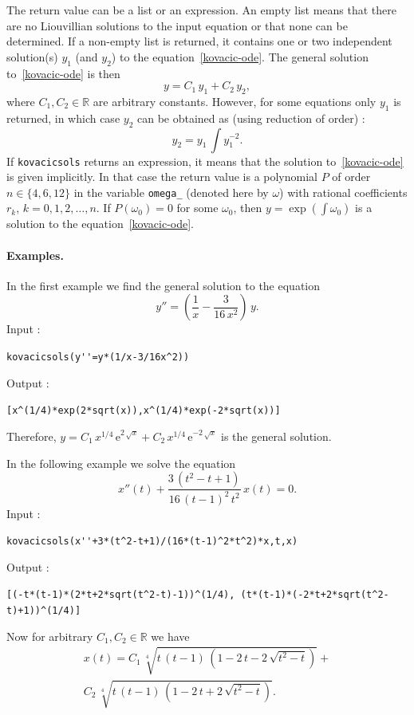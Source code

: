 \documentclass[a4paper,11pt]{book}
\newcommand{\C}{{\mathbb{C}}}
\begin{document}
The return value can be a list or an expression. An empty list means that there are no Liouvillian solutions to the input equation or that none can be determined. If a non-empty list is returned, it contains one or two independent solution(s) $y_1$ (and $y_2$) to the equation~\eqref{kovacic-ode}. The general solution to~\eqref{kovacic-ode} is then
\[ y=C_1\,y_1+C_2\,y_2, \]
where $C_1,C_2\in\mathbb{R}$ are arbitrary constants. However, for some equations only $y_1$ is returned, in which case $y_2$ can be obtained as (using reduction of order) :
\begin{equation}\label{kovacic-reduction}y_2=y_1\,\int y_1^{-2}.\end{equation}
If {\tt kovacicsols} returns an expression, it means that the solution to~\eqref{kovacic-ode} is given implicitly. In that case the return value is a polynomial $P$ of order $n\in\{4,6,12\}$ in the variable {\tt omega\_} (denoted here by $\omega$) with rational coefficients $r_k$, $k=0,1,2,\dots,n$. If $P(\omega_0)=0$ for some $\omega_0$, then $y=\exp\left(\int\omega_0\right)$ is a solution to the equation~\eqref{kovacic-ode}.

\paragraph{Examples.}
In the first example we find the general solution to the equation
\[ y''=\left(\frac{1}{x}-\frac{3}{16\,x^2}\right)\,y. \]
Input :
\begin{center}
  \tt kovacicsols(y\verb|''|=y*(1/x-3/16x\verb|^|2))
\end{center}
Output :
\begin{center}
  \tt [x\verb|^|(1/4)*exp(2*sqrt(x)),x\verb|^|(1/4)*exp(-2*sqrt(x))]
\end{center}
Therefore, $y=C_1\,x^{1/4}\,\mathrm{e}^{2\,\sqrt{x}}+C_2\,x^{1/4}\,\mathrm{e}^{-2\,\sqrt{x}}$ is the general solution.

In the following example we solve the equation
\[ x''(t)+\frac{3\,(t^2-t+1)}{16\,(t-1)^2\,t^2}\,x(t)=0. \]
Input :
\begin{center}
  \tt kovacicsols(x\verb|''|+3*(t\verb|^|2-t+1)/(16*(t-1)\verb|^|2*t\verb|^|2)*x,t,x)
\end{center}
Output :
\begin{center}
  \tt [(-t*(t-1)*(2*t+2*sqrt(t\verb|^|2-t)-1))\verb|^|(1/4), (t*(t-1)*(-2*t+2*sqrt(t\verb|^|2-t)+1))\verb|^|(1/4)]
\end{center}
Now for arbitrary $C_1,C_2\in\mathbb{R}$ we have
\[\begin{split}x(t)=C_1\,\sqrt[4]{t\,(t-1)\,(1-2\,t-2\,\sqrt{t^2-t})}+\\C_2\,\sqrt[4]{t\,(t-1)\,(1-2\,t+2\,\sqrt{t^2-t})}.\end{split}\]
\end{document}
